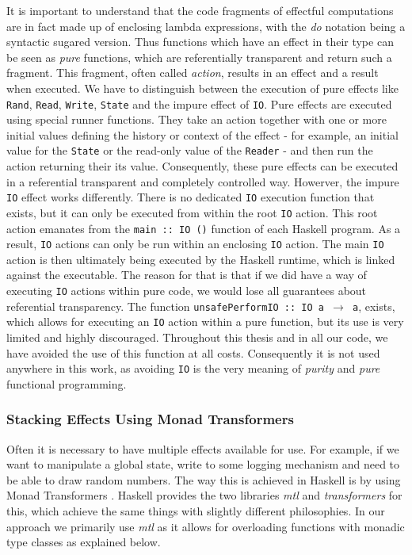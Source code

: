 It is important to understand that the code fragments of effectful computations are in fact  made up of enclosing lambda expressions, with the \textit{do} notation being a syntactic sugared version. Thus functions which have an effect in their type can be seen as \textit{pure} functions, which are referentially transparent and return such a fragment. This fragment, often called \textit{action}, results in an effect and a result when executed. We have to distinguish between the execution of pure effects like \texttt{Rand}, \texttt{Read}, \texttt{Write}, \texttt{State} and the impure effect of \texttt{IO}. Pure effects are executed using special runner functions. They take an action together with one or more initial values defining the history or context of the effect - for example, an initial value for the \texttt{State} or the read-only value of the \texttt{Reader} - and then run the action returning their its value. Consequently, these pure effects can be executed in a referential transparent and completely controlled way. Howerver, the impure \texttt{IO} effect works differently. There is no dedicated \texttt{IO} execution function that exists, but it can only be executed from within the root \texttt{IO} action. This root action emanates from the \texttt{main :: IO ()} function of each Haskell program. As a result, \texttt{IO} actions can only be run within an enclosing \texttt{IO} action. The main \texttt{IO} action is then ultimately being executed by the Haskell runtime, which is linked against the executable. The reason for that is that if we did have a way of executing \texttt{IO} actions within pure code, we would lose all guarantees about referential transparency. The function \texttt{unsafePerformIO :: IO a $\rightarrow$ a}, exists, which allows for executing an \texttt{IO} action within a pure function, but its use is very limited and highly discouraged. Throughout this thesis and in all our code, we have avoided the use of this function at all costs. Consequently it is not used anywhere in this work, as avoiding \texttt{IO} is the very meaning of \textit{purity} and \textit{pure} functional programming.

\subsubsection{Stacking Effects Using Monad Transformers}
\label{sec:back_transformers}
Often it is necessary to have multiple effects available for use. For example, if we want to manipulate a global state, write to some logging mechanism and need to be able to draw random numbers. The way this is achieved in Haskell is by using Monad Transformers \cite{jones_functional_1995}. Haskell provides the two libraries \textit{mtl} and \textit{transformers} for this, which achieve the same things with slightly different philosophies. In our approach we primarily use \textit{mtl} as it allows for overloading functions with monadic type classes as explained below.

